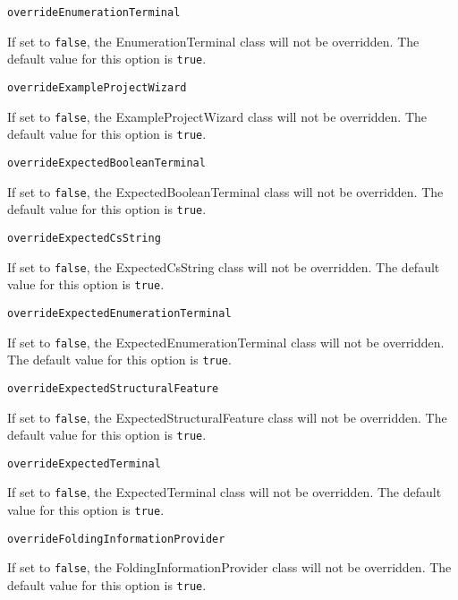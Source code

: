 \noindent\texttt{overrideEnumerationTerminal}
\begin{myindentpar}{1cm}
If set to \texttt{false}, the EnumerationTerminal class will not be overridden. The default value for this option is \texttt{true}.
\end{myindentpar}

\noindent\texttt{overrideExampleProjectWizard}
\begin{myindentpar}{1cm}
If set to \texttt{false}, the ExampleProjectWizard class will not be overridden. The default value for this option is \texttt{true}.
\end{myindentpar}

\noindent\texttt{overrideExpectedBooleanTerminal}
\begin{myindentpar}{1cm}
If set to \texttt{false}, the ExpectedBooleanTerminal class will not be overridden. The default value for this option is \texttt{true}.
\end{myindentpar}

\noindent\texttt{overrideExpectedCsString}
\begin{myindentpar}{1cm}
If set to \texttt{false}, the ExpectedCsString class will not be overridden. The default value for this option is \texttt{true}.
\end{myindentpar}

\noindent\texttt{overrideExpectedEnumerationTerminal}
\begin{myindentpar}{1cm}
If set to \texttt{false}, the ExpectedEnumerationTerminal class will not be overridden. The default value for this option is \texttt{true}.
\end{myindentpar}

\noindent\texttt{overrideExpectedStructuralFeature}
\begin{myindentpar}{1cm}
If set to \texttt{false}, the ExpectedStructuralFeature class will not be overridden. The default value for this option is \texttt{true}.
\end{myindentpar}

\noindent\texttt{overrideExpectedTerminal}
\begin{myindentpar}{1cm}
If set to \texttt{false}, the ExpectedTerminal class will not be overridden. The default value for this option is \texttt{true}.
\end{myindentpar}

\noindent\texttt{overrideFoldingInformationProvider}
\begin{myindentpar}{1cm}
If set to \texttt{false}, the FoldingInformationProvider class will not be overridden. The default value for this option is \texttt{true}.
\end{myindentpar}

